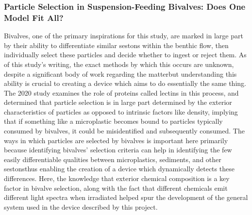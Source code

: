 \documentclass[fleqn,10pt]{SelfArx} %
\begin{document}
	\subsubsection*{Particle Selection in Suspension-Feeding Bivalves: Does One Model Fit All?}
	
	Bivalves, one of the primary inspirations for this study, are marked in large part by their ability to differentiate similar \glspl{seston} within the \gls{benthic} flow, then individually select these particles and decide whether to ingest or reject them. As of this study’s writing, the exact methods by which this occurs are unknown, despite a significant body of work regarding the matter\textemdash but understanding this ability is crucial to creating a device which aims to do essentially the same thing. The 2020 study examines the role of proteins called lectins in this process, and determined that particle selection is in large part determined by the exterior characteristics of particles as opposed to intrinsic factors like density, implying that if something like a microplastic becomes bound to particles typically consumed by bivalves, it could be misidentified and subsequently consumed. 
	The ways in which particles are selected by bivalves is important here primarily because identifying bivalves’ selection criteria can help in identifying the few easily differentiable qualities between microplastics, sediments, and other sestons\textemdash thus enabling the creation of a device which dynamically detects these differences. Here, the knowledge that exterior chemical composition is a key factor in bivalve selection, along with the fact that different chemicals emit different light spectra when irradiated helped spur the development of the general system used in the device described by this project.
	
\end{document}
